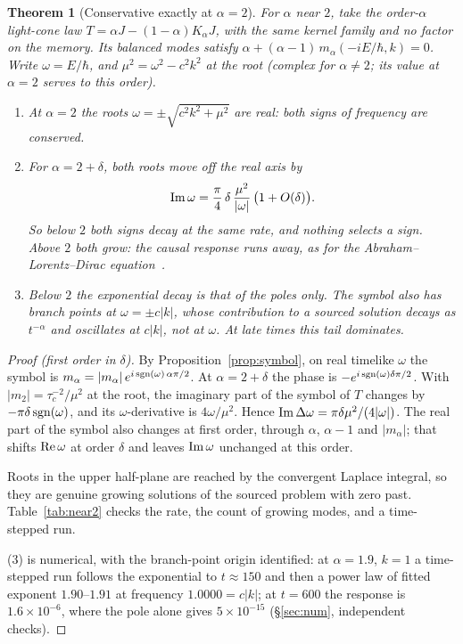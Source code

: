 \documentclass[11pt]{amsart}
\newtheorem{theorem}{Theorem}[section]
\theoremstyle{definition}
\theoremstyle{remark}
\begin{document}
\begin{theorem}[Conservative exactly at $\alpha=2$]\label{thm:near2}
For $\alpha$ near $2$, take the order-$\alpha$ light-cone law $T=\alpha J-(1-\alpha)K_\alpha J$, with the same kernel family and no factor on the memory. Its balanced modes satisfy $\alpha+(\alpha-1)\,m_\alpha(-iE/\hbar,k)=0$. Write $\omega=E/\hbar$, and $\mu^2=\omega^2-c^2k^2$ at the root (complex for $\alpha\ne2$; its value at $\alpha=2$ serves to this order).
\begin{enumerate}
\item At $\alpha=2$ the roots $\omega=\pm\sqrt{c^2k^2+\mu^2}$ are real: both signs of frequency are conserved.
\item For $\alpha=2+\delta$, both roots move off the real axis by
\[
{\rm Im}\,\omega=\frac\pi4\,\delta\,\frac{\mu^2}{\lvert\omega\rvert}\,\big(1+O(\delta)\big).
\]
So below $2$ both signs decay at the same rate, and nothing selects a sign. Above $2$ both grow: the causal response runs away, as for the Abraham--Lorentz--Dirac equation~\cite{Dirac}.
\item Below $2$ the exponential decay is that of the poles only. The symbol also has branch points at $\omega=\pm c\lvert k\rvert$, whose contribution to a sourced solution decays as $t^{-\alpha}$ and oscillates at $c\lvert k\rvert$, not at $\omega$. At late times this tail dominates.
\end{enumerate}
\end{theorem}

\begin{proof}[Proof (first order in $\delta$)]
By Proposition~\ref{prop:symbol}, on real timelike $\omega$ the symbol is $m_\alpha=\lvert m_\alpha\rvert\,e^{i\,{\rm sgn}(\omega)\,\alpha\pi/2}$. At $\alpha=2+\delta$ the phase is $-e^{i\,{\rm sgn}(\omega)\delta\pi/2}$. With $\lvert m_2\rvert=\tau_c^{-2}/\mu^2$ at the root, the imaginary part of the symbol of $T$ changes by $-\pi\delta\,{\rm sgn}(\omega)$, and its $\omega$-derivative is $4\omega/\mu^2$. Hence ${\rm Im}\,\Delta\omega=\pi\delta\mu^2/(4\lvert\omega\rvert)$. The real part of the symbol also changes at first order, through $\alpha$, $\alpha-1$ and $\lvert m_\alpha\rvert$; that shifts ${\rm Re}\,\omega$ at order $\delta$ and leaves ${\rm Im}\,\omega$ unchanged at this order.

Roots in the upper half-plane are reached by the convergent Laplace integral, so they are genuine growing solutions of the sourced problem with zero past. Table~\ref{tab:near2} checks the rate, the count of growing modes, and a time-stepped run.

(3) is numerical, with the branch-point origin identified: at $\alpha=1.9$, $k=1$ a time-stepped run follows the exponential to $t\approx150$ and then a power law of fitted exponent $1.90$--$1.91$ at frequency $1.0000=c\lvert k\rvert$; at $t=600$ the response is $1.6\times10^{-6}$, where the pole alone gives $5\times10^{-15}$ (\S\ref{sec:num}, independent checks).
\end{proof}
\end{document}
